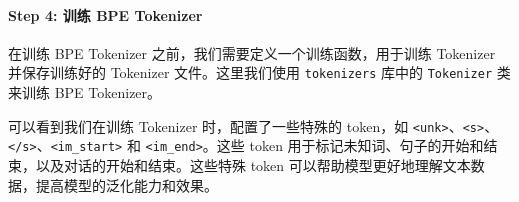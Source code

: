 \documentclass[
]{article}
\begin{document}
\paragraph{Step 4: 训练 BPE
Tokenizer}\label{step-4-ux8badux7ec3-bpe-tokenizer}

在训练 BPE Tokenizer 之前，我们需要定义一个训练函数，用于训练 Tokenizer
并保存训练好的 Tokenizer 文件。这里我们使用 \texttt{tokenizers} 库中的
\texttt{Tokenizer} 类来训练 BPE Tokenizer。

可以看到我们在训练 Tokenizer 时，配置了一些特殊的 token，如
\texttt{\textless{}unk\textgreater{}}、\texttt{\textless{}s\textgreater{}}、\texttt{\textless{}/s\textgreater{}}、\texttt{\textless{}\textbar{}im\_start\textbar{}\textgreater{}}
和 \texttt{\textless{}\textbar{}im\_end\textbar{}\textgreater{}}。这些
token 用于标记未知词、句子的开始和结束，以及对话的开始和结束。这些特殊
token 可以帮助模型更好地理解文本数据，提高模型的泛化能力和效果。
\end{document}
